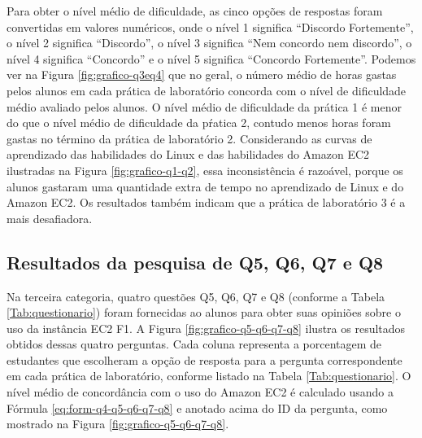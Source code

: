 \begin{figure}[htb!] 
   	    \captionsetup{width=15cm}%
\end{figure}

Para obter o nível médio de dificuldade, as cinco opções de respostas foram convertidas em valores numéricos, onde o nível 1 significa “Discordo Fortemente”, o nível 2 significa “Discordo”, o nível 3 significa “Nem concordo nem discordo”, o nível 4 significa “Concordo” e o nível 5 significa “Concordo Fortemente”. Podemos ver na Figura \ref{fig:grafico-q3eq4} que no geral, o número médio de horas gastas pelos alunos em cada prática de laboratório concorda com o nível de dificuldade médio avaliado pelos alunos. O nível médio de dificuldade da prática 1 é menor do que o nível médio de dificuldade da pŕatica 2, contudo menos horas foram gastas no término da prática de laboratório 2. Considerando as curvas de aprendizado das habilidades do Linux e das habilidades do Amazon EC2 ilustradas na Figura \ref{fig:grafico-q1-q2}, essa  inconsistência é razoável, porque os alunos gastaram uma quantidade extra de tempo no aprendizado de Linux e do Amazon EC2. Os resultados também indicam que a prática de laboratório 3 é a mais desafiadora.

\subsection{Resultados da pesquisa de Q5, Q6, Q7 e Q8}

Na terceira categoria, quatro questões Q5, Q6, Q7 e Q8 (conforme a Tabela \ref{Tab:questionario}) foram fornecidas ao alunos para obter suas opiniões sobre o uso da instância EC2 F1. A Figura \ref{fig:grafico-q5-q6-q7-q8} ilustra os resultados obtidos dessas quatro perguntas. Cada coluna representa a porcentagem de estudantes que escolheram a opção de resposta para a pergunta correspondente em cada prática de laboratório, conforme listado na Tabela \ref{Tab:questionario}. O nível médio de concordância com o uso do Amazon EC2 é calculado usando a Fórmula \ref{eq:form-q4-q5-q6-q7-q8} e anotado acima do ID da pergunta, como mostrado na Figura \ref{fig:grafico-q5-q6-q7-q8}. 



